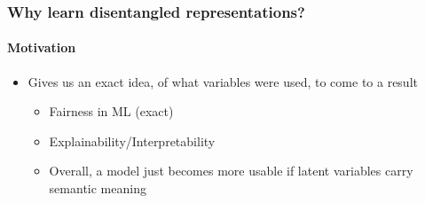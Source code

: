 \documentclass[9pt]{beamer}
\begin{document}
\begin{frame}
\frametitle{Why learn disentangled representations?}
\framesubtitle{Motivation}
\begin{itemize}%
	\item Gives us an exact idea, of what variables were used, to come to a result
	\begin{itemize}
			\item Fairness in ML (exact)
			\item Explainability/Interpretability
			\item Overall, a model just becomes more usable if latent variables carry semantic meaning		
	\end{itemize}

\end{itemize}
\end{frame} 
\end{document}
